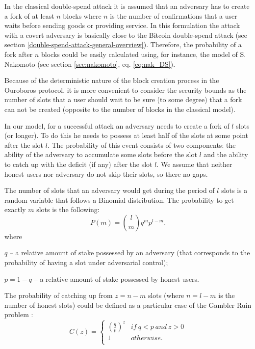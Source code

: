 \documentclass[10pt,a4paper]{article}
\numberwithin{equation}{section} %
\theoremstyle{plain}
\theoremstyle{definition}
\theoremstyle{remark}
\begin{document}
    In the classical double-spend attack it is assumed that an adversary has to create a fork of at least \(n\) blocks where \(n\) is the number of confirmations that a user waits before sending goods or providing service. In this formulation the attack with a covert adversary is basically close to the Bitcoin double-spend attack (see section \ref{double-spend-attack-general-overview}). Therefore, the probability of a fork after \(n\) blocks could be easily calculated using, for instance, the model of S. Nakomoto (see section \ref{sec:nakomoto}, eq. \ref{eq:nak_DS}).
    
    Because of the deterministic nature of the block creation process in the Ouroboros protocol, it is more convenient to consider the security bounds as the number of slots that a user should wait to be sure (to some degree) that a fork can not be created (opposite to the number of blocks in the classical model).
    
    In our model, for a successful attack an adversary needs to create a fork of \(l\) slots (or longer). To do this he needs to possess at least half of the slots at some point after the slot \(l\). The probability of this event consists of two components: the ability of the adversary to accumulate some slots before the slot \(l\) and the ability to catch up with the deficit (if any) after the slot \(l\). We assume that neither honest users nor adversary do not skip their slots, so there no gaps.
    
    The number of slots that an adversary would get during the period of \(l\) slots is a random variable that follows a Binomial distribution. The probability to get exactly \(m\) slots is the following:
    \begin{equation} \label{eq:covert_progress}
         P(m) = \binom{l}{m}q^{m}p^{l-m}.
    \end{equation}
    where 
    
    \(q\) -- a relative amount of stake possessed by an adversary (that corresponds to the probability of having a slot under adversarial control);
    
    \(p = 1-q\) -- a relative amount of stake possessed by honest users.
    
    The probability of catching up from \(z=n-m\) slots (where \(n=l-m\) is the number of honest slots) could be defined as a particular case of the Gambler Ruin problem \cite{F70}:
    \[ C(z) =  
        \left\{
            \begin{array}{ll}
                (\frac{q}{p})^{z} & if\ q < p\ and\ z > 0 \\
                1 & otherwise. \\
            \end{array}
        \right.
    \]
    
\end{document}
